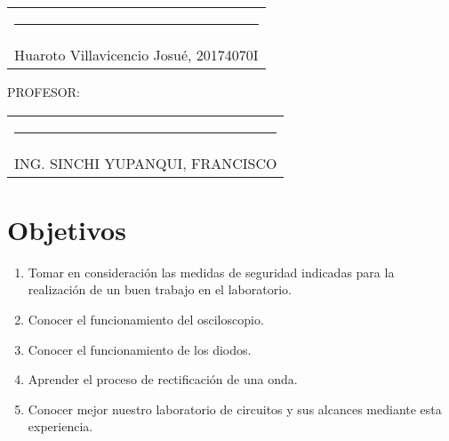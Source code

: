 \documentclass[a4paper,12pt]{report}
\begin{document}
\begin{center}
\begin{tabular}{c}
\rule[1pt]{3.14in}{1pt}\\
Huaroto Villavicencio Josué, 20174070I \\[2.5cm]
\end{tabular}
\end{center}

{\large PROFESOR:} \\[2cm]
\begin{center}
\begin{tabular}{c}
\rule[3pt]{4.8in}{1pt}\\[1pt]
ING. SINCHI YUPANQUI, FRANCISCO 
\end{tabular}
\end{center}
\vfill
\newpage
\tableofcontents
\newpage
{} %
\setcounter{page}{1}  %
\chapter{Objetivos}
\begin{enumerate}
\item Tomar en consideración las medidas de seguridad indicadas para la realización de un buen trabajo en el laboratorio.
\item Conocer el funcionamiento del osciloscopio.
\item Conocer el funcionamiento de los diodos.
\item Aprender el proceso de rectificación de una onda.
\item Conocer mejor nuestro laboratorio de circuitos y sus alcances mediante esta experiencia.
\end{enumerate}
\end{document}

